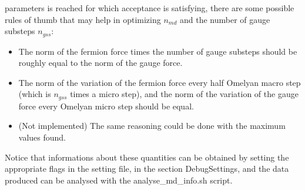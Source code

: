 parameters is reached for which acceptance is satisfying, there are some 
possible rules of thumb that may help in optimizing $n_{md}$ and the number 
of gauge substeps $n_{gss}$:
\begin{itemize}
    \item The norm of the fermion force times the number of gauge substeps should 
        be 
        roughly equal to the norm of the gauge force.
    \item The norm of the variation of the fermion force every half Omelyan macro 
        step 
        (which is $n_{gss}$ times a micro step), and the norm of the variation of the 
        gauge 
        force every Omelyan micro step should be equal.
    \item (Not implemented) The same reasoning could be done with the maximum values 
        found.
\end{itemize}

Notice that informations about these quantities can be obtained by setting the appropriate flags in the setting file, in the section \textsf{ DebugSettings}, and the 
data produced can be analysed with the \textsf{ analyse\_md\_info.sh} script.







